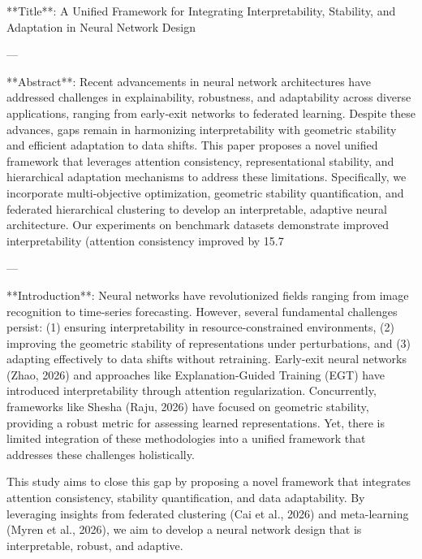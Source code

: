 **Title**: A Unified Framework for Integrating Interpretability, Stability, and Adaptation in Neural Network Design

---

**Abstract**:  
Recent advancements in neural network architectures have addressed challenges in explainability, robustness, and adaptability across diverse applications, ranging from early-exit networks to federated learning. Despite these advances, gaps remain in harmonizing interpretability with geometric stability and efficient adaptation to data shifts. This paper proposes a novel unified framework that leverages attention consistency, representational stability, and hierarchical adaptation mechanisms to address these limitations. Specifically, we incorporate multi-objective optimization, geometric stability quantification, and federated hierarchical clustering to develop an interpretable, adaptive neural architecture. Our experiments on benchmark datasets demonstrate improved interpretability (attention consistency improved by 15.7%

---

**Introduction**:  
Neural networks have revolutionized fields ranging from image recognition to time-series forecasting. However, several fundamental challenges persist: (1) ensuring interpretability in resource-constrained environments, (2) improving the geometric stability of representations under perturbations, and (3) adapting effectively to data shifts without retraining. Early-exit neural networks (Zhao, 2026) and approaches like Explanation-Guided Training (EGT) have introduced interpretability through attention regularization. Concurrently, frameworks like Shesha (Raju, 2026) have focused on geometric stability, providing a robust metric for assessing learned representations. Yet, there is limited integration of these methodologies into a unified framework that addresses these challenges holistically.

This study aims to close this gap by proposing a novel framework that integrates attention consistency, stability quantification, and data adaptability. By leveraging insights from federated clustering (Cai et al., 2026) and meta-learning (Myren et al., 2026), we aim to develop a neural network design that is interpretable, robust, and adaptive.

